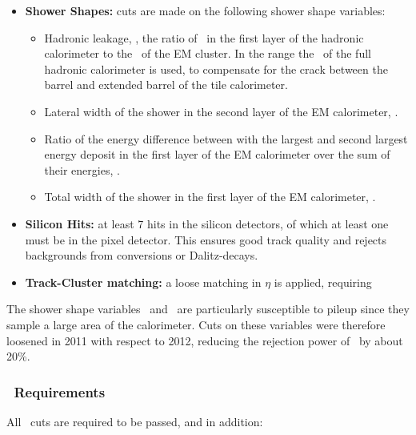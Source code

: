 \begin{itemize}

    \item {\bf Shower Shapes:} cuts are made on the following shower shape
    variables:

    \begin{itemize}
        \item Hadronic leakage, \Rhad, the ratio of \et\ in the first layer of
        the hadronic calorimeter to the \et\ of the EM cluster. In the range
         the \et\ of the full hadronic calorimeter is
        used, to compensate for the crack between the barrel and extended barrel
        of the tile calorimeter.
        \item Lateral width of the shower in the second layer of the EM
        calorimeter, \wetatwo.
        \item Ratio of the energy difference between with the largest and second
        largest energy deposit in the first layer of the EM calorimeter over the
        sum of their energies, \Eratio.
        \item Total width of the shower in the first layer of the EM
        calorimeter, \wstot.
    \end{itemize}

    \item {\bf Silicon Hits:} at least 7 hits in the silicon detectors, of which at
    least one must be in the pixel detector. This ensures good track quality and
    rejects backgrounds from conversions or Dalitz-decays.
    \item {\bf Track-Cluster matching:} a loose matching in $\eta$ is applied,
    requiring 
\end{itemize}

The shower shape variables \Reta\ and \Rhad\ are particularly susceptible to
pileup since they sample a large area of the calorimeter. Cuts on these
variables were therefore
loosened in 2011 with respect to 2012, reducing the rejection power of \loosePP\
by about 20\%.

\subsubsection{\mediumPP\ Requirements}

All \loosePP\ cuts are required to be passed, and in addition:

